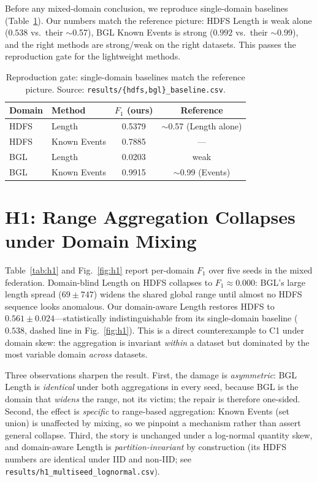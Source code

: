 \documentclass[journal]{IEEEtran}
\begin{document}
Before any mixed-domain conclusion, we reproduce single-domain baselines
(Table~\ref{tab:repro}). Our numbers match the reference picture: HDFS Length is weak alone
($0.538$ vs.\ their $\sim$0.57), BGL Known Events is strong ($0.992$ vs.\ their $\sim$0.99), and the
right methods are strong/weak on the right datasets. This passes the reproduction gate for the
lightweight methods.

\begin{table}[t]
\caption{Reproduction gate: single-domain baselines match the reference picture.
Source: \texttt{results/\{hdfs,bgl\}\_baseline.csv}.}
\label{tab:repro}
\centering
\begin{tabular}{@{}llcc@{}}
\toprule
Domain & Method & $F_1$ (ours) & Reference \\
\midrule
HDFS & Length       & 0.5379 & $\sim$0.57 (Length alone) \\
HDFS & Known Events & 0.7885 & --- \\
BGL  & Length       & 0.0203 & weak \\
BGL  & Known Events & 0.9915 & $\sim$0.99 (Events) \\
\bottomrule
\end{tabular}
\end{table}

\section{H1: Range Aggregation Collapses under Domain Mixing}\label{sec:h1}
Table~\ref{tab:h1} and Fig.~\ref{fig:h1} report per-domain $F_1$ over five seeds in the mixed
federation. Domain-blind Length on HDFS collapses to $F_1\approx0.000$: BGL's large length spread
($69\pm747$) widens the shared global range until almost no HDFS sequence looks anomalous. Our
domain-aware Length restores HDFS to $0.561\pm0.024$---statistically indistinguishable from its
single-domain baseline ($0.538$, dashed line in Fig.~\ref{fig:h1}). This is a direct counterexample
to C1 under domain skew: the aggregation is invariant \emph{within} a dataset but dominated by the
most variable domain \emph{across} datasets.

Three observations sharpen the result. First, the damage is \emph{asymmetric}: BGL Length is
\emph{identical} under both aggregations in every seed, because BGL is the domain that \emph{widens}
the range, not its victim; the repair is therefore one-sided. Second, the effect is \emph{specific}
to range-based aggregation: Known Events (set union) is unaffected by mixing, so we pinpoint a
mechanism rather than assert general collapse. Third, the story is unchanged under a log-normal
quantity skew, and domain-aware Length is \emph{partition-invariant} by construction (its HDFS
numbers are identical under IID and non-IID; see \texttt{results/h1\_multiseed\_lognormal.csv}).
\end{document}
